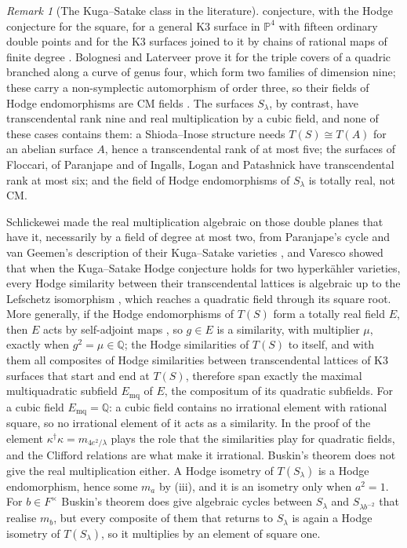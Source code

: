 \documentclass[11pt,reqno]{amsart}
\theoremstyle{plain}
\theoremstyle{definition}
\theoremstyle{remark}
\newtheorem{remark}[theorem]{Remark}
\newcommand{\QQ}{\mathbb{Q}}
\newcommand{\PP}{\mathbb{P}}
\begin{document}
\begin{remark}[The Kuga--Satake class in the literature]
conjecture, with the Hodge conjecture for the square, for a general K3
surface in $\PP^{4}$ with fifteen ordinary double points and for the K3
surfaces joined to it by chains of rational maps of finite degree
\cite[Theorems~1.5, 4.8 and~6.4]{ILP22}. Bolognesi and Laterveer prove it for
the triple covers of a quadric branched along a curve of genus four, which
form two families of dimension nine; these carry a non-symplectic
automorphism of order three, so their fields of Hodge endomorphisms are CM
fields \cite{BL24}. The surfaces $S_{\lambda}$, by contrast, have
transcendental rank nine and real multiplication by a cubic field, and none
of these cases contains them: a Shioda--Inose structure needs
$T(S)\cong T(A)$ for an abelian surface $A$, hence a transcendental rank of at
most five; the surfaces of Floccari, of Paranjape and of Ingalls, Logan and
Patashnick have transcendental rank at most six; and the field of Hodge
endomorphisms of $S_{\lambda}$ is totally real, not CM.

Schlickewei made the real multiplication algebraic on those double planes
that have it, necessarily by a field of degree at most two, from Paranjape's
cycle and van Geemen's description of their Kuga--Satake varieties
\cite{Sch10,vG08}, and Varesco showed that when the Kuga--Satake Hodge
conjecture holds for two hyperk\"ahler varieties, every Hodge similarity
between their transcendental lattices is algebraic up to the Lefschetz
isomorphism \cite{Var23}, which reaches a quadratic field through its square
root. More generally, if the Hodge endomorphisms of $T(S)$ form a totally
real field $E$, then $E$ acts by self-adjoint maps \cite{Zar83}, so $g\in E$
is a similarity, with multiplier $\mu$, exactly when $g^{2}=\mu\in\QQ$; the
Hodge similarities of $T(S)$ to itself, and with them all composites of Hodge
similarities between transcendental lattices of K3 surfaces that start and
end at $T(S)$, therefore span exactly the maximal multiquadratic subfield
$E_{\mathrm{mq}}$ of $E$, the compositum of its quadratic subfields. For a
cubic field $E_{\mathrm{mq}}=\QQ$: a cubic field contains no irrational
element with rational square, so no irrational element of it acts as a
similarity. In the proof of  the element
$\kappa^{\dagger}\kappa=m_{4e^{2}/\lambda}$ plays the role that the
similarities play for quadratic fields, and the Clifford relations are what
make it irrational. Buskin's theorem \cite{Bus19} does not give the real
multiplication either. A Hodge isometry of $T(S_{\lambda})$ is a Hodge
endomorphism, hence some $m_{a}$ by (iii), and it is an
isometry only when $a^{2}=1$. For $b\in F^{\times}$ Buskin's theorem does give
algebraic cycles between $S_{\lambda}$ and $S_{\lambda b^{-2}}$ that realise
$m_{b}$, but every composite of them that returns to $S_{\lambda}$ is again a
Hodge isometry of $T(S_{\lambda})$, so it multiplies by an element of square
one.


\end{remark}
\end{document}
